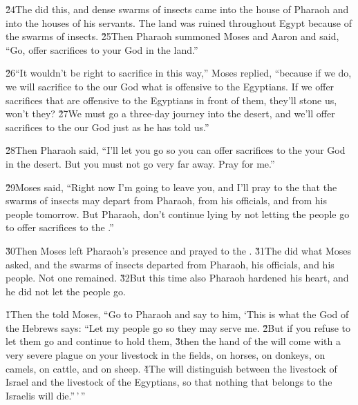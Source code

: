 \v{24}The  did this, and dense swarms of insects came into the house of Pharaoh and into the houses of his servants. The land was ruined throughout Egypt because of the swarms of insects. \v{25}Then Pharaoh summoned Moses and Aaron and said, ``Go, offer sacrifices to your God in the land.''

\v{26}``It wouldn't be right to sacrifice in this way,'' Moses replied, ``because if we do, we will sacrifice to the  our God what is offensive to the Egyptians. If we offer sacrifices that are offensive to the Egyptians in front of them, they'll stone us, won't they? \v{27}We must go a three-day journey into the desert, and we'll offer sacrifices to the  our God just as he has told us.''

\v{28}Then Pharaoh said, ``I'll let you go so you can offer sacrifices to the  your God in the desert. But you must not go very far away. Pray for me.''

\v{29}Moses said, ``Right now I'm going to leave you, and I'll pray to the  that the swarms of insects may depart from Pharaoh, from his officials, and from his people tomorrow. But Pharaoh, don't continue lying by not letting the people go to offer sacrifices to the .''

\v{30}Then Moses left Pharaoh's presence and prayed to the . \v{31}The  did what Moses asked, and the swarms of insects departed from Pharaoh, his officials, and his people. Not one remained. \v{32}But this time also Pharaoh hardened his heart, and he did not let the people go.

\v{1}Then the  told Moses, ``Go to Pharaoh and say to him, `This is what the  God of the Hebrews says: ``Let my people go so they may serve me. \v{2}But if you refuse to let them go and continue to hold them, \v{3}then the hand of the  will come with a very severe plague on your livestock in the fields, on horses, on donkeys, on camels, on cattle, and on sheep. \v{4}The  will distinguish between the livestock of Israel and the livestock of the Egyptians, so that nothing that belongs to the Israelis will die.''\,'\,''


